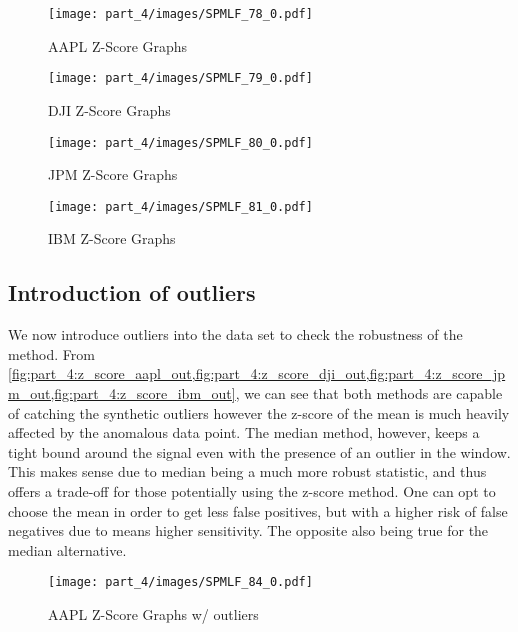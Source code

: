 \begin{figure}[!htb]
    \centering
    \texttt{[image: part\_4/images/SPMLF\_78\_0.pdf]}
    \caption{AAPL Z-Score Graphs}
    \label{fig:part_4:z_score_aapl}
\end{figure}

\begin{figure}[!htb]
    \centering
    \texttt{[image: part\_4/images/SPMLF\_79\_0.pdf]}
    \caption{DJI Z-Score Graphs}
    \label{fig:part_4:z_score_dji}
\end{figure}

\begin{figure}[!htb]
    \centering
    \texttt{[image: part\_4/images/SPMLF\_80\_0.pdf]}
    \caption{JPM Z-Score Graphs}
    \label{fig:part_4:z_score_jpm}
\end{figure}

\begin{figure}[!htb]
    \centering
    \texttt{[image: part\_4/images/SPMLF\_81\_0.pdf]}
    \caption{IBM Z-Score Graphs}
    \label{fig:part_4:z_score_ibm}
\end{figure}

\subsection{Introduction of outliers}

We now introduce outliers into the data set to check the robustness of the method. From \cref{fig:part_4:z_score_aapl_out,fig:part_4:z_score_dji_out,fig:part_4:z_score_jpm_out,fig:part_4:z_score_ibm_out}, we can see that both methods are capable of catching the synthetic outliers however the z-score of the mean is much heavily affected by the anomalous data point. The median method, however, keeps a tight bound around the signal even with the presence of an outlier in the window. This makes sense due to median being a much more robust statistic, and thus offers a trade-off for those potentially using the z-score method. One can opt to choose the mean in order to get less false positives, but with a higher risk of false negatives due to means higher sensitivity. The opposite also being true for the median alternative.

\begin{figure}[!htb]
    \centering
    \texttt{[image: part\_4/images/SPMLF\_84\_0.pdf]}
    \caption{AAPL Z-Score Graphs w/ outliers}
    \label{fig:part_4:z_score_aapl_out}
\end{figure}

